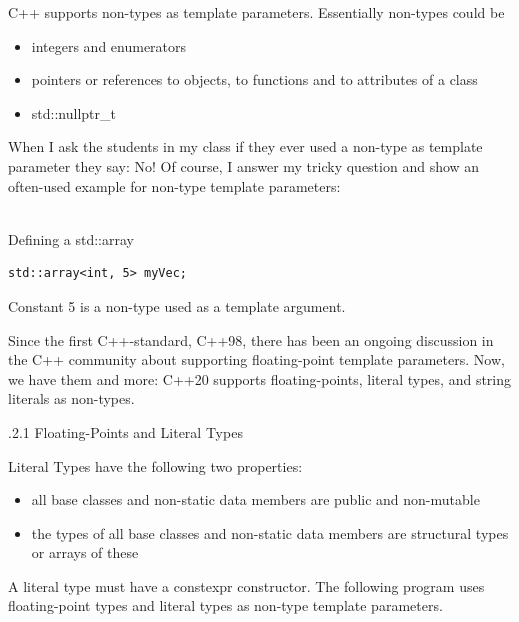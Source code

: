 C++ supports non-types as template parameters. Essentially non-types could be

\begin{itemize}
\item 
integers and enumerators

\item 
pointers or references to objects, to functions and to attributes of a class

\item 
std::nullptr\_t
\end{itemize}

\begin{tcolorbox}[colback=mygreen!5!white,colframe=mygreen!75!black,title={Typical Non-Type Template Parameter}]
When I ask the students in my class if they ever used a non-type as template parameter they say: No! Of course, I answer my tricky question and show an often-used example for non-type template parameters:

\hspace*{\fill} \\ %
\noindent
Defining a std::array
\begin{lstlisting}[style=styleCXX]
std::array<int, 5> myVec;
\end{lstlisting}

Constant 5 is a non-type used as a template argument.
\end{tcolorbox}	

Since the first C++-standard, C++98, there has been an ongoing discussion in the C++ community about supporting floating-point template parameters. Now, we have them and more: C++20 supports floating-points, literal types, and string literals as non-types.

.2.1\hspace{0.2cm} Floating-Points and Literal Types

Literal Types have the following two properties:

\begin{itemize}
\item 
all base classes and non-static data members are public and non-mutable

\item 
the types of all base classes and non-static data members are structural types or arrays of these
\end{itemize}

A literal type must have a constexpr constructor. The following program uses floating-point types and literal types as non-type template parameters.

